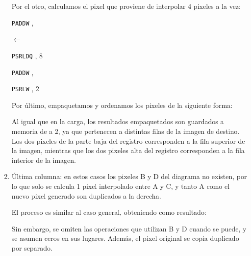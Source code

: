 \begin{enumerate}
  Por el otro, calculamos el pixel que proviene de interpolar 4 pixeles a la vez:

  \begin{center}
     

     

    \texttt{PADDW} ,  \hfill

     

     $\leftarrow$ 

    \texttt{PSRLDQ} , 8 \hfill

     

    \texttt{PADDW} ,  \hfill

     

    \texttt{PSRLW} , 2 \hfill

     
  \end{center}

  Por último, empaquetamos y ordenamos los pixeles de la siguiente forma:

  \begin{center}
     
  \end{center}

  Al igual que en la carga, los resultados empaquetados son guardados a memoria de a 2, ya que pertenecen a distintas filas de la imagen de destino. Los dos pixeles de la parte baja del registro corresponden a la fila superior de la imagen, mientras que los dos pixeles alta del registro corresponden a la fila interior de la imagen.

  \item Última columna: en estos casos los pixeles B y D del diagrama no existen, por lo que solo se calcula 1 pixel interpolado entre A y C, y tanto A como el nuevo pixel generado son duplicados a la derecha.

  El proceso es similar al caso general, obteniendo como resultado:

  \begin{center}
     
  \end{center}

  Sin embargo, se omiten las operaciones que utilizan B y D cuando se puede, y se asumen ceros en sus lugares. Además, el pixel original se copia duplicado por separado.


\end{enumerate}

